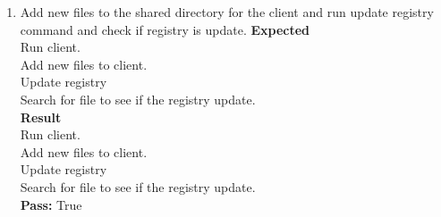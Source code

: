 \documentclass{article}
\begin{document}
\begin{enumerate}
\item Add new files to the shared directory for the client and run update registry command and check if registry is update. 
\textbf{Expected}\\
Run client. \\
Add new files to client.\\
Update registry\\
Search for file to see if the registry update.\\
\textbf{Result}\\
Run client. \\
Add new files to client.\\
Update registry\\
Search for file to see if the registry update.\\
\textbf{Pass:} True\\



\end{enumerate}
\end{document}
